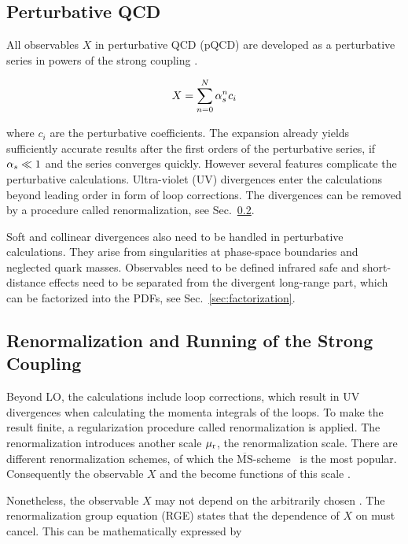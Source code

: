 \subsection{Perturbative QCD}

All observables $X$ in perturbative QCD (pQCD) are developed as a
perturbative series in powers of the strong coupling \as. 

\begin{equation*}
    X = \sum_{n=0}^N \alpha_{s}^n c_i 
\end{equation*}

where $c_i$ are the perturbative coefficients. The expansion already yields
sufficiently accurate results after the first orders of the perturbative series,
if $\alpha_{s} \ll 1$ and the series converges quickly. However several features
complicate the perturbative calculations. Ultra-violet (UV) divergences enter
the calculations beyond leading order in form of loop corrections. The
divergences can be removed by a procedure called renormalization, see
Sec.~\ref{sec:renormalization}.

Soft and collinear divergences also need to be handled in perturbative
calculations. They arise from singularities at phase-space boundaries and
neglected quark masses. Observables need to be defined infrared safe and
short-distance effects need to be separated from the divergent long-range part,
which can be factorized into the PDFs, see Sec.~\ref{sec:factorization}.

\subsection{Renormalization and Running of the Strong Coupling}
\label{sec:renormalization}

Beyond LO, the calculations include loop corrections, which result in UV
divergences when calculating the momenta integrals of the loops. To make the
result finite, a regularization procedure called renormalization is applied. The
renormalization introduces another scale $\mu_{\mathrm{r}}$, the renormalization scale.
There are different renormalization schemes, of which the
$\overline{\mathrm{MS}}$-scheme~\cite{Weinberg:1951ss,tHooft:1973mm} is the most
popular. Consequently the observable $X$ and the \as become functions of this
scale \mur. 

Nonetheless, the observable $X$ may not depend on the arbitrarily chosen \mur.
The renormalization group equation (RGE) states that the dependence of $X$ on
\mur must cancel. This can be mathematically expressed by

